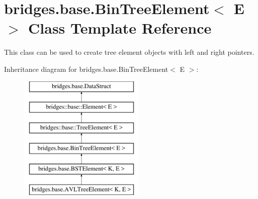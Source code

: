 \hypertarget{classbridges_1_1base_1_1_bin_tree_element}{}\section{bridges.\+base.\+Bin\+Tree\+Element$<$ E $>$ Class Template Reference}
\label{classbridges_1_1base_1_1_bin_tree_element}


This class can be used to create tree element objects with left and right pointers.  


Inheritance diagram for bridges.\+base.\+Bin\+Tree\+Element$<$ E $>$\+:\begin{figure}[H]
\begin{center}
\leavevmode
\includegraphics[height=6.000000cm]{classbridges_1_1base_1_1_bin_tree_element}
\end{center}
\end{figure}

